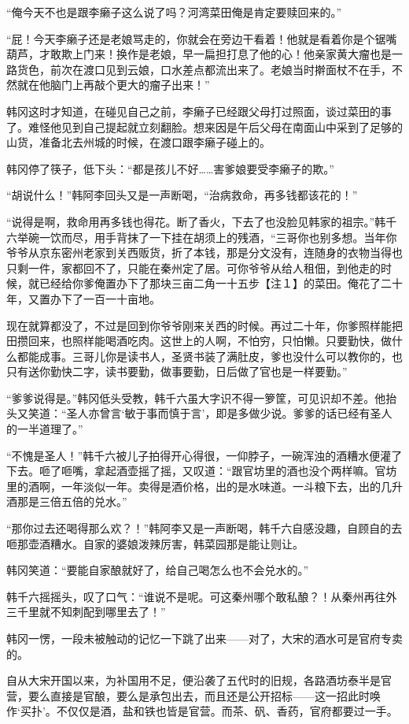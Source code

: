 “俺今天不也是跟李癞子这么说了吗？河湾菜田俺是肯定要赎回来的。”

“屁！今天李癞子还是老娘骂走的，你就会在旁边干看着！他就是看着你是个锯嘴葫芦，才敢欺上门来！换作是老娘，早一扁担打息了他的心！他亲家黄大瘤也是一路货色，前次在渡口见到云娘，口水差点都流出来了。老娘当时擀面杖不在手，不然就在他脑门上再敲个更大的瘤子出来！”

韩冈这时才知道，在碰见自己之前，李癞子已经跟父母打过照面，谈过菜田的事了。难怪他见到自己提起就立刻翻脸。想来因是午后父母在南面山中采到了足够的山货，准备北去州城的时候，在渡口跟李癞子碰上的。

韩冈停了筷子，低下头：“都是孩儿不好……害爹娘要受李癞子的欺。”

“胡说什么！”韩阿李回头又是一声断喝，“治病救命，再多钱都该花的！”

“说得是啊，救命用再多钱也得花。断了香火，下去了也没脸见韩家的祖宗。”韩千六举碗一饮而尽，用手背抹了一下挂在胡须上的残酒，“三哥你也别多想。当年你爷爷从京东密州老家到关西贩货，折了本钱，那是分文没有，连随身的衣物当得也只剩一件，家都回不了，只能在秦州定了居。可你爷爷从给人租佃，到他走的时候，就已经给你爹俺置办下了那块三亩二角一十五步【注１】的菜田。俺花了二十年，又置办下了一百一十亩地。

现在就算都没了，不过是回到你爷爷刚来关西的时候。再过二十年，你爹照样能把田攒回来，也照样能喝酒吃肉。这世上的人啊，不怕穷，只怕懒。只要勤快，做什么都能成事。三哥儿你是读书人，圣贤书装了满肚皮，爹也没什么可以教你的，也只有送你勤快二字，读书要勤，做事要勤，日后做了官也是一样要勤。”

“爹爹说得是。”韩冈低头受教，韩千六虽大字识不得一箩筐，可见识却不差。他抬头又笑道：“圣人亦曾言‘敏于事而慎于言’，即是多做少说。爹爹的话已经有圣人的一半道理了。”

“不愧是圣人！”韩千六被儿子拍得开心得很，一仰脖子，一碗浑浊的酒糟水便灌了下去。咂了咂嘴，拿起酒壶摇了摇，又叹道：“跟官坊里的酒也没个两样嘛。官坊里的酒啊，一年淡似一年。卖得是酒价格，出的是水味道。一斗粮下去，出的几升酒那是三倍五倍的兑水。”

“那你过去还喝得那么欢？！”韩阿李又是一声断喝，韩千六自感没趣，自顾自的去咂那壶酒糟水。自家的婆娘泼辣厉害，韩菜园那是能让则让。

韩冈笑道：“要能自家酿就好了，给自己喝怎么也不会兑水的。”

韩千六摇摇头，叹了口气：“谁说不是呢。可这秦州哪个敢私酿？！从秦州再往外三千里就不知刺配到哪里去了！”

韩冈一愣，一段未被触动的记忆一下跳了出来——对了，大宋的酒水可是官府专卖的。

自从大宋开国以来，为补国用不足，便沿袭了五代时的旧规，各路酒坊泰半是官营，要么直接是官酿，要么是承包出去，而且还是公开招标——这一招此时唤作‘买扑’。不仅仅是酒，盐和铁也皆是官营。而茶、矾、香药，官府都要过一手。

